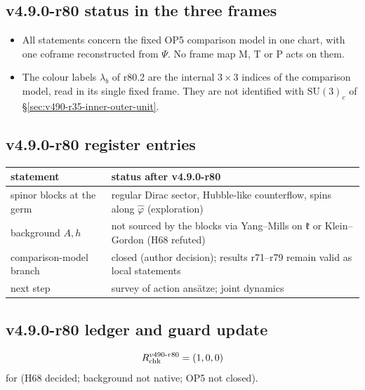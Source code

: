 \subsection*{v4.9.0-r80 status in the three frames}
\label{subsec:v490-r80-frames}

\begin{itemize}[leftmargin=2em]
\item All statements concern the fixed OP5 comparison model in one chart, with one coframe reconstructed from \(\Psi\).  No
frame map M, T or P acts on them.
\item The colour labels \(\lambda_b\) of r80.2 are the internal \(3\times3\) indices of the comparison model, read in its
single fixed frame.  They are not identified with \(\mathrm{SU}(3)_c\) of \S\ref{sec:v490-r35-inner-outer-unit}.
\end{itemize}

\subsection*{v4.9.0-r80 register entries}
\label{subsec:v490-r80-register}

\begin{center}
\small
\begin{tabular}{@{}>{\raggedright\arraybackslash}p{}>{\raggedright\arraybackslash}p{}@{}}
\toprule
statement & status after v4.9.0-r80\\
\midrule
spinor blocks at the germ & regular Dirac sector, Hubble-like counterflow, spins along \(\hat\varphi\) (exploration)\\
background \(A,h\) & not sourced by the blocks via Yang--Mills on \(\mathfrak k\) or Klein--Gordon (H68 refuted)\\
comparison-model branch & closed (author decision); results r71--r79 remain valid as local statements\\
next step & survey of action ansätze; joint dynamics\\
\bottomrule
\end{tabular}
\end{center}

\subsection*{v4.9.0-r80 ledger and guard update}
\label{subsec:v490-r80-ledger-guard}

\[
R_{\rm chk}^{v490\text{-}r80}=(1,0,0)
\]
for (H68 decided; background not native; OP5 not closed).


